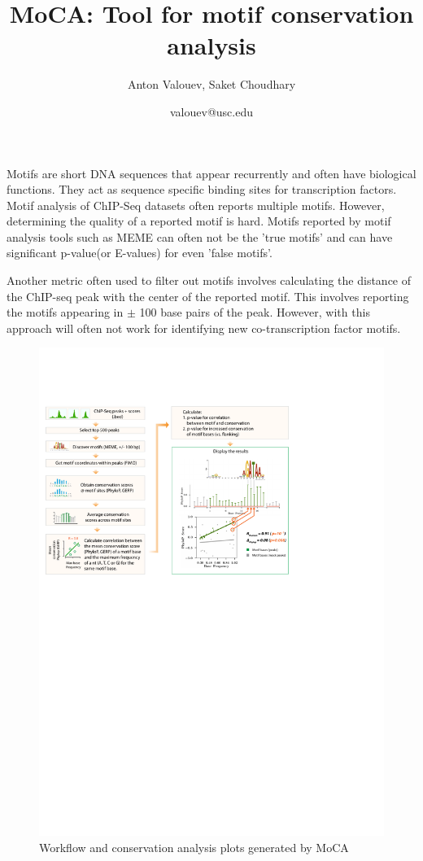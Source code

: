 \documentclass[11pt,a4paper]{article}
\title{MoCA: Tool for motif conservation analysis}
\author{Anton Valouev, Saket Choudhary}
\date{valouev@usc.edu}
\begin{document}
\maketitle
Motifs are short DNA sequences that appear recurrently and often have biological functions. They act as sequence specific binding sites for transcription factors. Motif analysis of ChIP-Seq datasets often reports multiple motifs. However, determining the quality of a reported motif is hard. Motifs reported by motif analysis tools such as MEME\cite{bailey2015meme} can often not be the 'true motifs' and  can have significant p-value(or E-values) for even 'false motifs'. 


Another metric often used to filter out motifs involves calculating the distance of the ChIP-seq peak with the center of the reported motif. This involves reporting the motifs appearing in $\pm$ 100 base pairs of the peak. 
However, with this approach will often not work for
identifying new co-transcription factor motifs.

\begin{figure}
	\centering
	\includegraphics[scale=0.7]{workflow}
	\caption {Workflow and conservation analysis plots generated by MoCA}
\end{figure}
\end{document}
